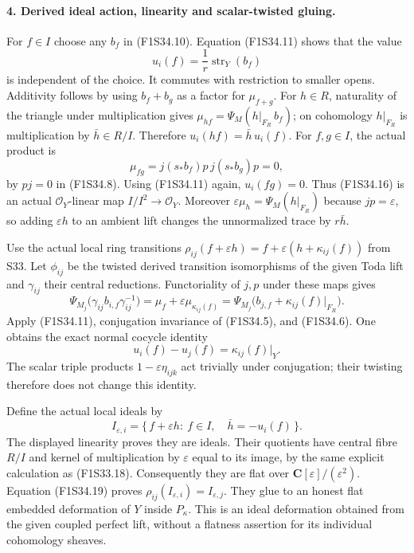\paragraph{4. Derived ideal action, linearity and scalar-twisted gluing.}
For $f\in I$ choose any $b_f$ in (F1S34.10).
Equation (F1S34.11) shows that the value
\[
       u_i(f)=\frac1r\operatorname{str}_Y(b_f)
 \tag{F1S34.16}
\]
is independent of the choice.
It commutes with restriction to smaller opens.
Additivity follows by using $b_f+b_g$ as a
factor for $\mu_{f+g}$.
For $h\in R$, naturality of the triangle
under multiplication gives
$\mu_{hf}=\Psi_M(h|_{F_R}\,b_f)$;
on cohomology $h|_{F_R}$ is multiplication
by $\bar h\in R/I$.
Therefore $u_i(hf)=\bar h\,u_i(f)$.
For $f,g\in I$, the actual product is
\[
 \mu_{fg}
   =j(s_*b_f)p\,j(s_*b_g)p=0,
 \tag{F1S34.17}
\]
by $pj=0$ in (F1S34.8).
Using (F1S34.11) again, $u_i(fg)=0$.
Thus (F1S34.16) is an actual
$\mathcal O_Y$-linear map
$I/I^2\to\mathcal O_Y$.
Moreover $\varepsilon\mu_h=\Psi_M(h|_{F_R})$
because $jp=\varepsilon$, so adding
$\varepsilon h$ to an ambient lift changes
the unnormalized trace by $r\bar h$.

Use the actual local ring transitions
$\rho_{ij}(f+\varepsilon h)
 =f+\varepsilon(h+\kappa_{ij}(f))$
from S33. Let $\phi_{ij}$ be the twisted
derived transition isomorphisms of the given
Toda lift and $\gamma_{ij}$ their central
reductions. Functoriality of $j,p$ under
these maps gives
\[
 \Psi_{M_j}\bigl(\gamma_{ij}b_{i,f}\gamma_{ij}^{-1}\bigr)
     =\mu_f+\varepsilon\mu_{\kappa_{ij}(f)}
     =\Psi_{M_j}\bigl(b_{j,f}
                       +\kappa_{ij}(f)|_{F_R}\bigr).
 \tag{F1S34.18}
\]
Apply (F1S34.11), conjugation invariance of
(F1S34.5), and (F1S34.6). One obtains the
exact normal cocycle identity
\[
                     u_i(f)-u_j(f)=\kappa_{ij}(f)|_Y.
 \tag{F1S34.19}
\]
The scalar triple products
$1-\varepsilon\eta_{ijk}$ act trivially
under conjugation; their twisting therefore
does not change this identity.

Define the actual local ideals by
\[
 I_{\varepsilon,i}
   =\{\,f+\varepsilon h:\ f\in I,\quad
                              \bar h=-u_i(f)\,\}.
 \tag{F1S34.20}
\]
The displayed linearity proves they are ideals.
Their quotients have central fibre $R/I$ and
kernel of multiplication by $\varepsilon$
equal to its image, by the same explicit
calculation as (F1S33.18).
Consequently they are flat over
$\mathbf C[\varepsilon]/(\varepsilon^2)$.
Equation (F1S34.19) proves
$\rho_{ij}(I_{\varepsilon,i})=I_{\varepsilon,j}$.
They glue to an honest flat embedded deformation
of $Y$ inside $P_\kappa$.
This is an ideal deformation obtained from
the given coupled perfect lift, without a
flatness assertion for its individual
cohomology sheaves.

